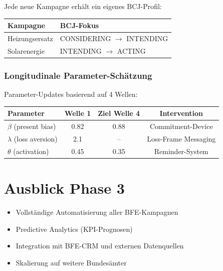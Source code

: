 \documentclass[11pt,a4paper]{article}
\begin{document}
Jede neue Kampagne erhält ein eigenes BCJ-Profil:

\begin{tabular}{l l}
\toprule
\textbf{Kampagne} & \textbf{BCJ-Fokus}\\
\midrule
\rowcolor{falightgray}
Heizungsersatz & CONSIDERING $\rightarrow$ INTENDING\\
Solarenergie & INTENDING $\rightarrow$ ACTING\\
\bottomrule
\end{tabular}

\subsubsection{Longitudinale Parameter-Schätzung}

Parameter-Updates basierend auf 4 Wellen:

\begin{tabular}{l c c c}
\toprule
\textbf{Parameter} & \textbf{Welle 1} & \textbf{Ziel Welle 4} & \textbf{Intervention}\\
\midrule
\rowcolor{falightgray}
$\beta$ (present bias) & 0.82 & 0.88 & Commitment-Device\\
$\lambda$ (loss aversion) & 2.1 & -- & Loss-Frame Messaging\\
\rowcolor{falightgray}
$\theta$ (activation) & 0.45 & 0.35 & Reminder-System\\
\bottomrule
\end{tabular}

\newpage

\section{Ausblick Phase 3}

\begin{tcolorbox}[infobox={Mögliche Ziele Phase 3 (2027)}]
\begin{itemize}[leftmargin=*]
    \item Vollständige Automatisierung aller BFE-Kampagnen
    \item Predictive Analytics (KPI-Prognosen)
    \item Integration mit BFE-CRM und externen Datenquellen
    \item Skalierung auf weitere Bundesämter
\end{itemize}
\end{tcolorbox}
\end{document}
